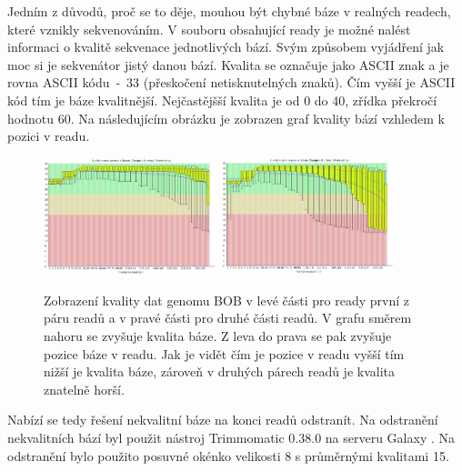 \documentclass[czech,DP]{thesiskiv}
\numberwithin{equation}{section}
\begin{document}
\noindent
Jedním z důvodů, proč se to děje, mouhou být chybné báze v realných readech, které vznikly sekvenováním. V souboru obsahující ready je možné nalést informaci o kvalitě sekvenace jednotlivých bází. Svým způsobem vyjádření jak moc si je sekvenátor jistý danou bází. Kvalita se označuje jako ASCII znak a je rovna ASCII kódu~-~33 (přeskočení netisknutelných znaků). Čím vyšší je ASCII kód tím je báze kvalitnější. Nejčastějšší kvalita je od 0 do 40, zřídka překročí hodnotu 60. Na následujícím obrázku je zobrazen graf kvality bází vzhledem k pozici v readu.

\begin{figure}[H]		
		\centering
		\includegraphics[width=190px]{./img/quality_graf_bob_no_trim_r1.png}
		\includegraphics[width=190px]{./img/quality_graf_bob_no_trim_r2.png}
		\caption{Zobrazení kvality dat genomu BOB v levé části pro ready první z páru readů a v pravé části pro druhé části readů. V grafu směrem nahoru se zvyšuje kvalita báze. Z leva do prava se pak zvyšuje pozice báze v readu. Jak je vidět čím je pozice v readu vyšší tím nižší je kvalita báze, zároveň v druhých párech readů je kvalita znatelně horší.}
		\label{fig:graf_quality_no_trim}
\end{figure}


\noindent
Nabízí se tedy řešení nekvalitní báze na konci readů odstranít. Na odstranění nekvalitních bází byl použit nástroj Trimmomatic 0.38.0 na serveru Galaxy \cite{galaxy}. Na odstranění bylo použito posuvné okénko velikosti 8 s průměrnými kvalitami 15. 
\end{document}
